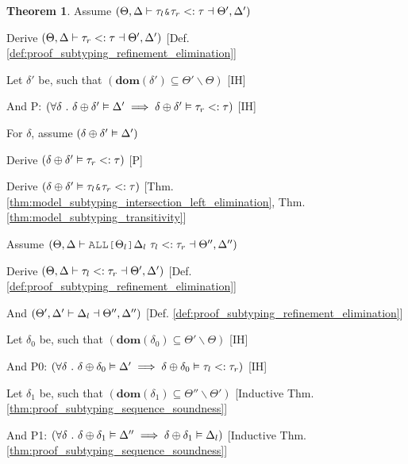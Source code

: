 \documentclass[acmsmall]{acmart}
\theoremstyle{definition}
\newtheorem{theorem}{Theorem}[section]
\begin{document}
\begin{theorem}

  \item \N Assume $(
    \Theta, \Delta \entails \tau_{l}\J{\&}\tau_{r}  \subtypes \tau \given \Theta', \Delta'
  )$
  \item \I \N Derive $(
    \Theta, \Delta \vdash \tau_r <: \tau \dashv \Theta', \Delta' 
  )$ [Def. \ref{def:proof_subtyping_refinement_elimination}]

  \item \I \N Let $\delta'$ be, such that $(
    \textbf{dom}(\delta') \subseteq \Theta' \backslash \Theta
  )$ [IH]
  \item \I \N And P: $(
    \forall \delta \ .\  
    \delta \oplus \delta' \vDash \Delta' 
    \implies 
    \delta \oplus \delta' \vDash \tau_r <: \tau
  )$ [IH]
  \item \I \N For $\delta$, 
    assume $(\delta \oplus \delta' \vDash \Delta')$
  \item \I\I \N Derive $(
    \delta \oplus \delta' \vDash \tau_r <: \tau
  )$ [P]
  \item \I\I \N Derive $(
    \delta \oplus \delta' \satisfies \tau_l \J{\&} \tau_r \subtypes \tau 
  )$ [Thm. \ref{thm:model_subtyping_intersection_left_elimination}, Thm. \ref{thm:model_subtyping_transitivity}]


  \item \N Assume $(
    \Theta, \Delta \entails 
    \J{ALL[}\Theta_l\J{]} \Delta_l\ \tau_l
    \subtypes 
    \tau_r
    \given \Theta'', \Delta'' 
  )$
  \item \I \N Derive $(
    \Theta, \Delta \vdash \tau_l <: \tau_r \dashv \Theta', \Delta'
  )$ [Def. \ref{def:proof_subtyping_refinement_elimination}]
  \item \I \N And $(
    \Theta', \Delta' \vdash \Delta_l \dashv \Theta'', \Delta'' 
  )$ [Def. \ref{def:proof_subtyping_refinement_elimination}]

  \item \I \N Let $\delta_0$ be, such that $(
    \textbf{dom}(\delta_0) \subseteq \Theta' \backslash \Theta
  )$ [IH]
  \item \I \N And P0: $(
    \forall \delta \ .\  
    \delta \oplus \delta_0 \vDash \Delta' 
    \implies 
    \delta \oplus \delta_0 \vDash \tau_l <: \tau_r
  )$ [IH]

  \item \I \N Let $\delta_1$ be, such that $(
    \textbf{dom}(\delta_1) \subseteq \Theta'' \backslash \Theta'
  )$ [Inductive Thm. \ref{thm:proof_subtyping_sequence_soundness}]
  \item \I \N And P1: $(
    \forall \delta \ .\  
    \delta \oplus \delta_1 \vDash \Delta'' 
    \implies 
    \delta \oplus \delta_1 \vDash \Delta_l 
  )$ [Inductive Thm. \ref{thm:proof_subtyping_sequence_soundness}]



\end{theorem}
\end{document}
